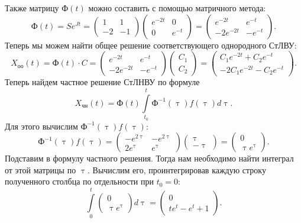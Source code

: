 \documentclass[a4paper, 12pt]{article}
\newcommand{\FI}{\text{Ф}}
\renewcommand{\tau}{\uptau}
\begin{document}
Также матрицу $\FI(t)$ можно составить с помощью матричного метода:
$$\FI(t) = Se^{Jt} = \begin{pmatrix}
	1 & 1\\
	-2 & -1
\end{pmatrix}\begin{pmatrix}
e^{-2t} & 0\\
0 & e^{-t}
\end{pmatrix} = \begin{pmatrix}
e^{-2t} & e^{-t}\\
-2e^{-2t} & -e^{-t}
\end{pmatrix}.$$
Теперь мы можем найти общее решение соответствующего однородного СтЛВУ:
$$X_{\text{оо}}(t) = \FI(t)\cdot C = 
	\begin{pmatrix}
			e^{-2t} & e^{-t}\\
		-2e^{-2t} & -e^{-t}
	\end{pmatrix}\begin{pmatrix}
	C_1\\C_2
\end{pmatrix} = \begin{pmatrix}
C_1e^{-2t} + C_2e^{-t}\\
-2C_1e^{-2t} - C_2e^{-t}
\end{pmatrix}.$$
Теперь найдем частное решение СтЛНВУ по формуле $$X_{\text{чн}}(t) =\FI(t) \int\limits_{t_0}^t\FI^{-1}(\uptau) f(\uptau)d\uptau. $$
Для этого вычислим $\FI^{-1}(\uptau)f(\uptau)$:
$$\FI^{-1}(\uptau)f(\uptau) = \begin{pmatrix}
	-e^{2\uptau} & -e^{2\uptau}\\
	2e^{\uptau} & e^{\uptau}
\end{pmatrix}\begin{pmatrix}
\tau\\-\tau
\end{pmatrix} = \begin{pmatrix}
0 \\ \tau e^{\tau}
\end{pmatrix}.$$
Подставим в формулу частного решения. Тогда нам необходимо найти интеграл от этой матрицы по $\tau$. Вычислим его, проинтегрировав каждую строку полученного столбца по отдельности при $t_0 = 0$:
$$\int\limits_{0}^t \begin{pmatrix}
	0 \\ \tau e^{\tau}
\end{pmatrix}d\tau = \begin{pmatrix}
0\\
te^t - e^t + 1
\end{pmatrix}.$$
\end{document}
